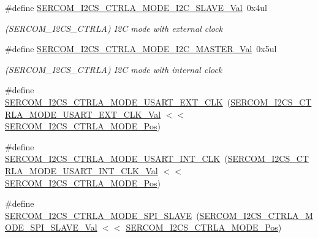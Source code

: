 \begin{DoxyCompactItemize}
\#define \mbox{\hyperlink{group___s_a_m_d21___s_e_r_c_o_m_ga8319a0fc9fb61abc778357210f5da803}{S\+E\+R\+C\+O\+M\+\_\+\+I2\+C\+S\+\_\+\+C\+T\+R\+L\+A\+\_\+\+M\+O\+D\+E\+\_\+\+I2\+C\+\_\+\+S\+L\+A\+V\+E\+\_\+\+Val}}~0x4ul
\begin{DoxyCompactList}\small\item\em (S\+E\+R\+C\+O\+M\+\_\+\+I2\+C\+S\+\_\+\+C\+T\+R\+LA) I2C mode with external clock \end{DoxyCompactList}\item 
\#define \mbox{\hyperlink{group___s_a_m_d21___s_e_r_c_o_m_ga2cafcb7e390d8d952ce70d420f12988b}{S\+E\+R\+C\+O\+M\+\_\+\+I2\+C\+S\+\_\+\+C\+T\+R\+L\+A\+\_\+\+M\+O\+D\+E\+\_\+\+I2\+C\+\_\+\+M\+A\+S\+T\+E\+R\+\_\+\+Val}}~0x5ul
\begin{DoxyCompactList}\small\item\em (S\+E\+R\+C\+O\+M\+\_\+\+I2\+C\+S\+\_\+\+C\+T\+R\+LA) I2C mode with internal clock \end{DoxyCompactList}\item 
\#define \mbox{\hyperlink{group___s_a_m_d21___s_e_r_c_o_m_gad65c66c0e9c936983fb7c9530218f661}{S\+E\+R\+C\+O\+M\+\_\+\+I2\+C\+S\+\_\+\+C\+T\+R\+L\+A\+\_\+\+M\+O\+D\+E\+\_\+\+U\+S\+A\+R\+T\+\_\+\+E\+X\+T\+\_\+\+C\+LK}}~(\mbox{\hyperlink{group___s_a_m_d21___s_e_r_c_o_m_gaaa18fe2839fc589f07a2befe7b796cdb}{S\+E\+R\+C\+O\+M\+\_\+\+I2\+C\+S\+\_\+\+C\+T\+R\+L\+A\+\_\+\+M\+O\+D\+E\+\_\+\+U\+S\+A\+R\+T\+\_\+\+E\+X\+T\+\_\+\+C\+L\+K\+\_\+\+Val}} $<$$<$ \mbox{\hyperlink{group___s_a_m_d21___s_e_r_c_o_m_ga28b25756139973e68744537e28f53c09}{S\+E\+R\+C\+O\+M\+\_\+\+I2\+C\+S\+\_\+\+C\+T\+R\+L\+A\+\_\+\+M\+O\+D\+E\+\_\+\+Pos}})
\item 
\#define \mbox{\hyperlink{group___s_a_m_d21___s_e_r_c_o_m_gaf69e7dd3b6ac789613833e1438001666}{S\+E\+R\+C\+O\+M\+\_\+\+I2\+C\+S\+\_\+\+C\+T\+R\+L\+A\+\_\+\+M\+O\+D\+E\+\_\+\+U\+S\+A\+R\+T\+\_\+\+I\+N\+T\+\_\+\+C\+LK}}~(\mbox{\hyperlink{group___s_a_m_d21___s_e_r_c_o_m_ga0eaee60cd97e87486d37896a4c95a016}{S\+E\+R\+C\+O\+M\+\_\+\+I2\+C\+S\+\_\+\+C\+T\+R\+L\+A\+\_\+\+M\+O\+D\+E\+\_\+\+U\+S\+A\+R\+T\+\_\+\+I\+N\+T\+\_\+\+C\+L\+K\+\_\+\+Val}} $<$$<$ \mbox{\hyperlink{group___s_a_m_d21___s_e_r_c_o_m_ga28b25756139973e68744537e28f53c09}{S\+E\+R\+C\+O\+M\+\_\+\+I2\+C\+S\+\_\+\+C\+T\+R\+L\+A\+\_\+\+M\+O\+D\+E\+\_\+\+Pos}})
\item 
\#define \mbox{\hyperlink{group___s_a_m_d21___s_e_r_c_o_m_gab88a7c934a90517a879088d0cfb095b4}{S\+E\+R\+C\+O\+M\+\_\+\+I2\+C\+S\+\_\+\+C\+T\+R\+L\+A\+\_\+\+M\+O\+D\+E\+\_\+\+S\+P\+I\+\_\+\+S\+L\+A\+VE}}~(\mbox{\hyperlink{group___s_a_m_d21___s_e_r_c_o_m_gaa0da439156c0ba9e09a62e0cceaa13ad}{S\+E\+R\+C\+O\+M\+\_\+\+I2\+C\+S\+\_\+\+C\+T\+R\+L\+A\+\_\+\+M\+O\+D\+E\+\_\+\+S\+P\+I\+\_\+\+S\+L\+A\+V\+E\+\_\+\+Val}} $<$$<$ \mbox{\hyperlink{group___s_a_m_d21___s_e_r_c_o_m_ga28b25756139973e68744537e28f53c09}{S\+E\+R\+C\+O\+M\+\_\+\+I2\+C\+S\+\_\+\+C\+T\+R\+L\+A\+\_\+\+M\+O\+D\+E\+\_\+\+Pos}})
$$
\end{DoxyCompactItemize}
